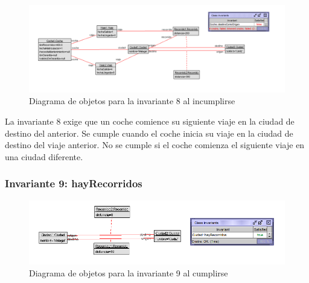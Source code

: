 \documentclass[12pt.a4paper]{article}
\begin{document}
\begin{figure}[H]
     \includegraphics[width=1\linewidth]{Soils/8_v2.png}
     \caption{Diagrama de objetos para la invariante 8 al incumplirse}
\end{figure}

La invariante 8 exige que un coche comience su siguiente viaje en la ciudad de destino del anterior. Se cumple cuando el coche inicia su viaje en la ciudad de destino del viaje anterior. No se cumple si el coche comienza el siguiente viaje en una ciudad diferente.

\subsubsection{Invariante 9: hayRecorridos}
    \begin{figure}[H]
         \centering
         \includegraphics[width=1\linewidth]{Soils/9.png}
         \caption{Diagrama de objetos para la invariante 9 al cumplirse}
    \end{figure}
\end{document}
